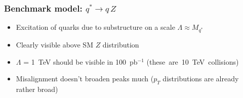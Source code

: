 \documentclass[compress]{beamer}
\begin{document}
\begin{frame}
\frametitle{Benchmark model: $q^* \to q \, Z$}
\begin{itemize}
\item Excitation of quarks due to substructure on a scale $\Lambda \approx M_{q^*}$
\item Clearly visible above SM $Z$ distribution
\item $\Lambda$ = 1~TeV should be visible in 100~pb$^{-1}$ \mbox{(these are 10~TeV collisions)\hspace{-1 cm}}
\item Misalignment doesn't broaden peaks much ($p_T$ distributions are already rather broad)
\end{itemize}


\end{frame}
\end{document}
